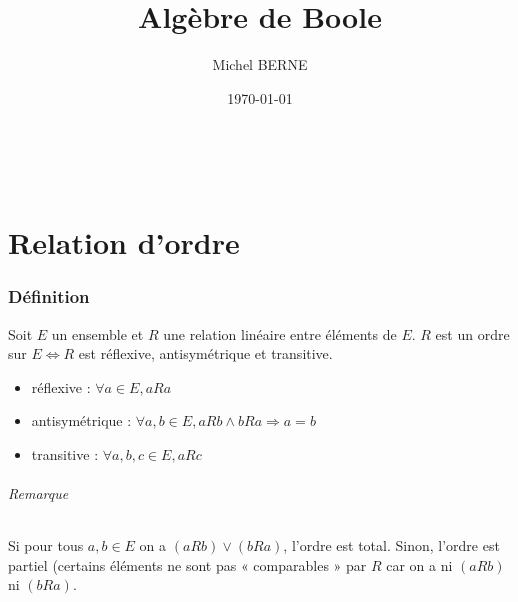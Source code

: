 \documentclass[11pt]{article}
\begin{document}
    \title{Algèbre de Boole}
    \author{Michel BERNE}
    \date{\today}

\maketitle
\newpage
~\\

\renewcommand{\contentsname}{Sommaire}
\tableofcontents
\newpage

\part{Relation d'ordre}
    \section{Définition}
        Soit $E$ un ensemble et $R$ une relation linéaire entre éléments de $E$. $R$ est un ordre sur $E \Leftrightarrow R$ est réflexive, antisymétrique et transitive.
        \begin{itemize}
            \item réflexive : $\forall a\in E,aRa$
            \item antisymétrique : $\forall a,b\in E,aRb\land bRa\Rightarrow a=b$
            \item transitive : $\forall a,b,c\in E,aRc$
        \end{itemize}

        \paragraph{Remarque} Si pour tous $a,b\in E$ on a $(aRb)\lor(bRa)$, l'ordre est total. Sinon, l'ordre est partiel (certains éléments ne sont pas « comparables » par $R$ car on a ni $(aRb)$ ni $(bRa)$.
\end{document}
